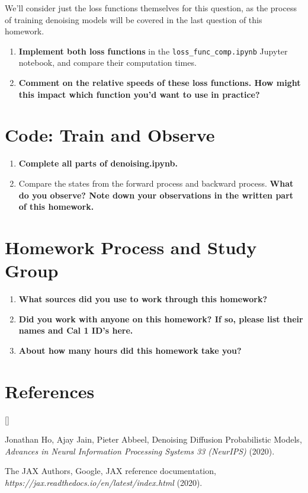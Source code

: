 \documentclass{article}
\def\beginrefs{\begin{list}%
        {[\arabic{equation}]}{\usecounter{equation}
         \setlength{\leftmargin}{2.0truecm}\setlength{\labelsep}{0.4truecm}%
         \setlength{\labelwidth}{1.6truecm}}}
\def\endrefs{\end{list}}
\def\bibentry#1{\item[\hbox{[#1]}]}
\begin{document}
We'll consider just the loss functions themselves for this question, as the process of training denoising models will be covered in the last question of this homework.

\begin{enumerate}
    \item
        \textbf{Implement both loss functions} in the \verb|loss_func_comp.ipynb| Jupyter notebook, and compare their computation times.
    \item
        \textbf{Comment on the relative speeds of these loss functions. How might this impact which function you'd want to use in practice?}
\end{enumerate}

\section{Code: Train and Observe}
\begin{enumerate}
    \item
        \textbf{Complete all parts of 
        denoising.ipynb.}
    \item 
        Compare the states from the forward process and backward process. \textbf{What do you observe? Note down your observations in the written part of this homework.}
\end{enumerate}

\section{Homework Process and Study Group}
\begin{enumerate}
    \item
        \textbf{What sources did you use to work through this homework?}
    \item
        \textbf{Did you work with anyone on this homework? If so, please list their names and Cal 1 ID's here.}
    \item
        \textbf{About how many hours did this homework take you?}
\end{enumerate}

\section*{References}
\beginrefs
\bibentry{1}{\sc Jonathan Ho}, {\sc Ajay Jain}, {\sc Pieter Abbeel},
Denoising Diffusion Probabilistic Models, 
{\it Advances in Neural Information Processing Systems 33 (NeurIPS)\/} (2020).
\bibentry{2}{\sc The JAX Authors}, {\sc Google}, 
JAX reference documentation, \\
{\it https://jax.readthedocs.io/en/latest/index.html\/} (2020).


\endrefs
\end{document}
